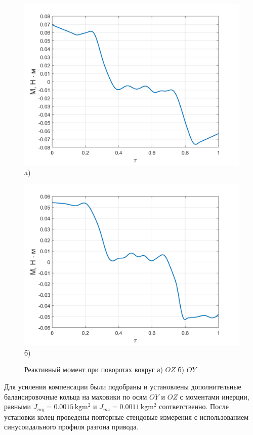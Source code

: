 \begin{figure}[!h]
	\begin{minipage}[b]{0.49\linewidth}\centering
		\includegraphics[width=0.8\linewidth]{matlab/img/oy-gyro-mom.png}\\[-2pt] a)
	\end{minipage}
	\hfill
	\begin{minipage}[b]{0.49\linewidth}\centering
		\includegraphics[width=0.8\linewidth]{matlab/img/oz-gyro-mom.png}\\[-2pt] б)
	\end{minipage}
	\caption{Реактивный момент при поворотах вокруг а) $OZ$ б) $OY$}
	\label{fig:omn-mom}
\end{figure}

Для усиления компенсации были подобраны и установлены дополнительные балансировочные кольца на маховики  по осям $OY$ и $OZ$ с моментами инерции, равными $J_{my}=\num{0.0015}\,\si{\kilo\gram\meter\squared}$ и $J_{mz}=\num{0.0011}\,\si{\kilo\gram\meter\squared}$ соответственно. После установки колец проведены повторные стендовые измерения с использованием синусоидального профиля разгона привода.


